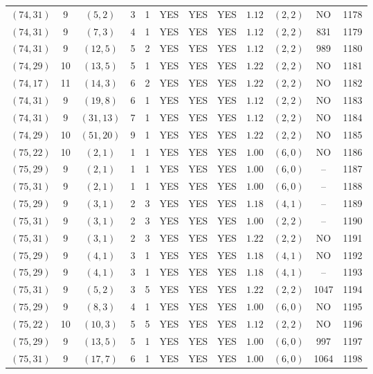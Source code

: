 \begin{longtable}{|c|c|c|c|c|c|c|c|c|c|c|c|}
$(74,31)$ & 9 & $(5,2)$ & 3 & 1 & YES & YES & YES & $1.12$ & $(2,2)$ & NO & 1178\\
$(74,31)$ & 9 & $(7,3)$ & 4 & 1 & YES & YES & YES & $1.12$ & $(2,2)$ & 831 & 1179\\
$(74,31)$ & 9 & $(12,5)$ & 5 & 2 & YES & YES & YES & $1.12$ & $(2,2)$ & 989 & 1180\\
$(74,29)$ & 10 & $(13,5)$ & 5 & 1 & YES & YES & YES & $1.22$ & $(2,2)$ & NO & 1181\\
$(74,17)$ & 11 & $(14,3)$ & 6 & 2 & YES & YES & YES & $1.22$ & $(2,2)$ & NO & 1182\\
$(74,31)$ & 9 & $(19,8)$ & 6 & 1 & YES & YES & YES & $1.12$ & $(2,2)$ & NO & 1183\\
$(74,31)$ & 9 & $(31,13)$ & 7 & 1 & YES & YES & YES & $1.12$ & $(2,2)$ & NO & 1184\\
$(74,29)$ & 10 & $(51,20)$ & 9 & 1 & YES & YES & YES & $1.22$ & $(2,2)$ & NO & 1185\\
$(75,22)$ & 10 & $(2,1)$ & 1 & 1 & YES & YES & YES & $1.00$ & $(6,0)$ & NO & 1186\\
$(75,29)$ & 9 & $(2,1)$ & 1 & 1 & YES & YES & YES & $1.00$ & $(6,0)$ & -- & 1187\\
$(75,31)$ & 9 & $(2,1)$ & 1 & 1 & YES & YES & YES & $1.00$ & $(6,0)$ & -- & 1188\\
$(75,29)$ & 9 & $(3,1)$ & 2 & 3 & YES & YES & YES & $1.18$ & $(4,1)$ & -- & 1189\\
$(75,31)$ & 9 & $(3,1)$ & 2 & 3 & YES & YES & YES & $1.00$ & $(2,2)$ & -- & 1190\\
$(75,31)$ & 9 & $(3,1)$ & 2 & 3 & YES & YES & YES & $1.22$ & $(2,2)$ & NO & 1191\\
$(75,29)$ & 9 & $(4,1)$ & 3 & 1 & YES & YES & YES & $1.18$ & $(4,1)$ & NO & 1192\\
$(75,29)$ & 9 & $(4,1)$ & 3 & 1 & YES & YES & YES & $1.18$ & $(4,1)$ & -- & 1193\\
$(75,31)$ & 9 & $(5,2)$ & 3 & 5 & YES & YES & YES & $1.22$ & $(2,2)$ & 1047 & 1194\\
$(75,29)$ & 9 & $(8,3)$ & 4 & 1 & YES & YES & YES & $1.00$ & $(6,0)$ & NO & 1195\\
$(75,22)$ & 10 & $(10,3)$ & 5 & 5 & YES & YES & YES & $1.12$ & $(2,2)$ & NO & 1196\\
$(75,29)$ & 9 & $(13,5)$ & 5 & 1 & YES & YES & YES & $1.00$ & $(6,0)$ & 997 & 1197\\
$(75,31)$ & 9 & $(17,7)$ & 6 & 1 & YES & YES & YES & $1.00$ & $(6,0)$ & 1064 & 1198\\

\end{longtable}
